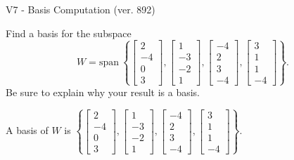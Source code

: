 \begin{exercise}
  \begin{exerciseTitle}V7 - Basis Computation (ver. 892)\end{exerciseTitle}
  \begin{exerciseStatement}
    Find a basis for the subspace 
\[W=\mathrm{span}\ \left\{\left[\begin{array}{r}
2 \\
-4 \\
0 \\
3
\end{array}\right] , \left[\begin{array}{r}
1 \\
-3 \\
-2 \\
1
\end{array}\right] , \left[\begin{array}{r}
-4 \\
2 \\
3 \\
-4
\end{array}\right] , \left[\begin{array}{r}
3 \\
1 \\
1 \\
-4
\end{array}\right]\right\}.\]
 Be sure to explain why your result is a basis.


  \end{exerciseStatement}
  \begin{exerciseAnswer}
   A basis of \(W\) is  \(\left\{\left[\begin{array}{r}
2 \\
-4 \\
0 \\
3
\end{array}\right] , \left[\begin{array}{r}
1 \\
-3 \\
-2 \\
1
\end{array}\right] , \left[\begin{array}{r}
-4 \\
2 \\
3 \\
-4
\end{array}\right] , \left[\begin{array}{r}
3 \\
1 \\
1 \\
-4
\end{array}\right]\right\}\).
  


  \end{exerciseAnswer}
\end{exercise}